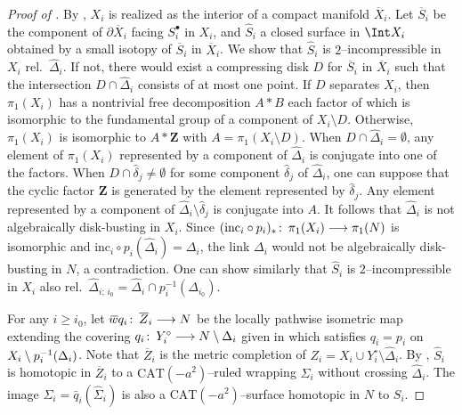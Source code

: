 \documentclass{gtart_a}
\theoremstyle{definition}
\numberwithin{equation}{section}
\begin{document}
\begin{proof}[Proof of ]
By , $X_i$ is realized as the interior of a compact manifold $\overline X_i$.
Let $\overline S_i$ be the component of $\partial \overline X_i$ facing $S_i^\bullet$ in $X_i$, 
and $\hat S_i$ a closed surface in $\Int X_i$ obtained by a small isotopy of $\overline S_i$ in 
$\overline X_i$.
We show that $\hat S_i$ is $2$--incompressible in $X_i$ rel.\ $\hat \Delta_i$.
If not, there would exist a compressing disk $D$ for $\overline S_i$ in $\overline X_i$ such that the 
intersection $D\cap \hat \Delta_i$ consists of at most one point.
If $D$ separates $X_i$, then $\pi_1(X_i)$ has a nontrivial free decomposition $A*B$ each factor of which is 
isomorphic to the fundamental group of a component of $X_i\setminus D$.
Otherwise, $\pi_1(X_i)$ is isomorphic to $A*\mathbf{Z}$ with $A=\pi_1(X_i\setminus D)$.
When $D\cap \hat \Delta_i=\emptyset$, any element of $\pi_1(X_i)$ represented by a component of $\hat \Delta_i$ is 
conjugate into one of the factors.
When $D\cap \hat \delta_j\neq \emptyset$ for some component $\hat \delta_j$ of $\hat \Delta_i$, one can suppose 
that the cyclic factor $\mathbf{Z}$ is generated by the element represented by $\hat \delta_j$.
Any element represented by a component of $\hat \Delta_i\setminus \hat\delta_j$ is conjugate into $A$.
It follows that $\hat \Delta_i$ is not algebraically disk-busting in $X_i$.
Since $(\mathrm{inc}_i\circ p_i)_*\mskip0.5mu\colon\thinspace \pi_1(X_i)\longrightarrow \pi_1(N)$ is isomorphic and 
$\mathrm{inc}_i\circ p_i(\hat \Delta_i)= \Delta_i$, the link $\Delta_i$ would not be algebraically 
disk-busting in $N$, a contradiction.
One can show similarly that $\hat S_i$ is $2$--incompressible in $X_i$ also rel.\ $\hat \Delta_{i;\,i_0}=
\hat \Delta_i\cap p_i^{-1}(\Delta_{i_0})$.




For any $i\geq i_0$, let $\bar q_i\co \overline Z_i\longrightarrow N$ be the locally pathwise isometric map 
extending the covering $q_i\mskip0.5mu\colon\thinspace Y_i^\circ \longrightarrow N\setminus \Delta_i$ given in  which satisfies 
$q_i=p_i$ on $X_i\setminus p_{\smash{i}}^{-1}(\Delta_i)$.
Note that $\overline Z_i$ is the metric completion of $Z_i=X_i\cup Y_i^\circ \setminus \hat \Delta_i$.
By , $\hat S_i$ is homotopic in $\overline Z_i$ to a $\mathrm{CAT}(-a^2)$--ruled 
wrapping $\hat\Sigma_i$ without crossing $\hat\Delta_i$.
The image $\Sigma_i=\bar q_i(\hat\Sigma_i)$ is also a $\mathrm{CAT}(-a^2)$--surface homotopic in $N$ to $S_i$.



\end{proof}
\end{document}
